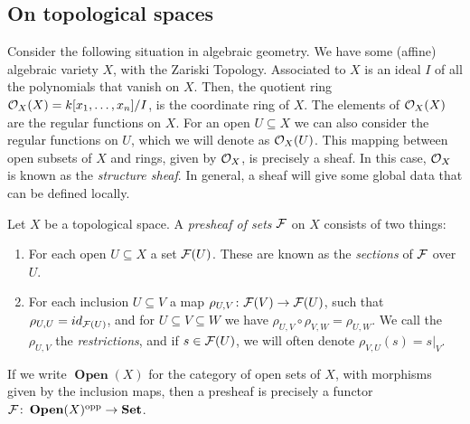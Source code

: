 \documentclass{article}
\DeclareMathOperator{\Open}{\mathbf{Open}}
\DeclareMathOperator{\opp}{opp}
\begin{document}
\subsection{On topological spaces}
Consider the following situation in algebraic geometry.
We have some (affine) algebraic variety $X$, with the Zariski Topology.
Associated to $X$ is an ideal $I$ of all the polynomials that vanish
on $X$. Then, the quotient ring $\mathcal{O}_X(X) = k[x_1,\ldots,x_n]/I$, is
the coordinate ring of $X$. The elements of $\mathcal{O}_X(X)$ are the regular
functions on $X$. For an open $U\subseteq X$ we can also consider the
regular functions on $U$, which we will denote as $\mathcal{O}_X(U)$.
This mapping between open subsets of $X$ and rings,
given by $\mathcal{O}_X$, is precisely a sheaf.
In this case, $\mathcal{O}_X$ is known as the \emph{structure sheaf}.
In general, a sheaf will give some global data that can be defined
locally.
\begin{definition}[Presheaves]
    Let $X$ be a topological space.
    A \emph{presheaf of sets} $\mathcal{F}$ on $X$ consists of two things:
    \begin{enumerate}
        \item For each open $U\subseteq X$ a set $\mathcal{F}(U)$.
              These are known as the \emph{sections} of $\mathcal{F}$ over $U$.
        \item For each inclusion $U\subseteq V$ a map
              $\rho_{U,V}\colon \mathcal{F}(V) \to \mathcal{F}(U)$, such that $\rho_{U,U} = id_{\mathcal{F}(U)}$, and
              for $U\subseteq V \subseteq W$ we have $\rho_{U,V}\circ \rho_{V,W} = \rho_{U, W}$.
              We call the $\rho_{U,V}$ the \emph{restrictions}, and if $s\in \mathcal{F}(U)$,
              we will often denote $\rho_{V,U}(s) = s|_V$.
    \end{enumerate}
\end{definition}
\begin{remark}
    If we write $\Open(X)$ for the category of open sets of $X$,
    with morphisms given by the inclusion maps, then a presheaf is
    precisely a functor $\mcF\colon \Open(X)^{\opp} \to \Set$.
\end{remark}
\end{document}
